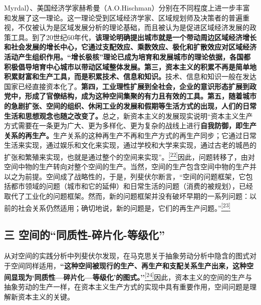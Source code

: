 \documentclass[UTF8, fontset = sourcesans, a4paper, oneside, zihao =
-4, scheme=chinese, no-math, space=true]{ctexbook}
\begin{document}
Myrdal）、美国经济学家赫希曼（A.O.Hischman）分别在不同程度上进一步丰富和发展了这一理论。这一理论受到区域经济学家、区域规划师及决策者的普遍重视，不仅被认为是区域发展分析的理论基础，而且被认为是促进区域经济发展的政策工具。到了20世纪60年代，\textbf{该理论明确提出城市就是一个带动周边区域经济增长和社会发展的增长中心，它通过支配效应、乘数效应、极化和扩散效应对区域经济活动产生组织作用。``增长极核''理论已成为培育和发展城市的理论依据，各国都积极倡导培育中心城市以带动区域整体发展。第三，资本主义的积累不再是简单地积累财富和生产工具，而是积累技术、信息和知识。}技术、信息和知识一般在发达国家已经直接资本化了。\textbf{第四，工业理性扩展到全社会，企业的意识形态扩展到政党中，形成了官僚结构，成为这种空间集聚的有力且有效的工具。第五，随着城市的急剧扩张、空间的组织、休闲工业的发展和假期等生活方式的出现，人们的日常生活和思想观念也随之改变了。}总之，新资本主义的发展现实说明``资本主义生产方式需要在一条更为广大、更为多样化、更为复杂的战线上进行\textbf{自我防御，即生产关系的再生产。}生产关系的这种再生产不再和生产方式的再生产同步；它通过日常生活来实现，通过娱乐和文化来实现，通过学校和大学来实现，通过古老的城邑的扩张和繁殖来实现，也就是通过整个的空间来实现''。\protect\hypertarget{part0007_split_001.htmlux5cux23w22}{}{}\protect\hyperlink{part0007_split_004.htmlux5cux23m22}{\textsuperscript{{[}22{]}}}因此，问题转移了，由对空间中物的生产转向对整个空间的生产。当然，空间的生产包含空间中物的生产并以之为前提。空间成了战略性的，于是，列斐伏尔断言，``空间的问题框架，它包括都市领域的问题（城市和它的延伸）和日常生活的问题（消费的被规划），已经取代了工业化的问题框架。然而，新的问题框架并没有破坏早期的一系列问题：以前的社会关系仍然适用；确切地说，新的问题是，它们的再生产问题。''\protect\hypertarget{part0007_split_001.htmlux5cux23w23}{}{}\protect\hyperlink{part0007_split_004.htmlux5cux23m23}{\textsuperscript{{[}23{]}}}

\subsection{\texorpdfstring{三
空间的``同质性-碎片化-等级化''}{三 空间的同质性-碎片化-等级化}}\label{part0007_split_001.htmlux5cux23c027}

从对空间的实践分析中列斐伏尔发现，在马克思关于抽象劳动分析中隐含的图式对于空间同样适用，\textbf{``这种空间被现行的生产、再生产和支配关系生产出来，这种空间显现为`同质性---碎片化---等级化'的图式。''}\protect\hypertarget{part0007_split_001.htmlux5cux23w24}{}{}\protect\hyperlink{part0007_split_004.htmlux5cux23m24}{\textsuperscript{{[}24{]}}}因此，资本主义的空间的生产与抽象劳动的生产一样，在资本主义生产方式的实现中具有重要作用，空间问题是理解新资本主义的关键。
\end{document}
